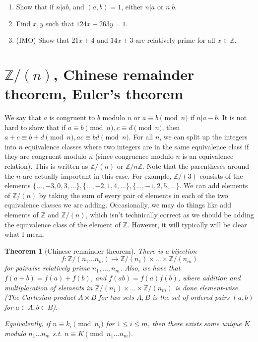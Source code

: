 \documentclass{article}
\theoremstyle{plain}
\newtheorem{theorem}{Theorem}
\numberwithin{equation}{section}
\begin{document}
\begin{enumerate}
\item Show that if $n|ab$, and $(a, b) = 1$, either $n|a$ or $n|b$.
\item Find $x, y$ such that $124x + 263y = 1$.
\item (IMO) Show that $21x + 4$ and $14x + 3$ are relatively prime for all $x\in\mathbb{Z}.$
\end{enumerate}

\section*{$\mathbb{Z}/(n)$, Chinese remainder theorem, Euler's theorem}

We say that $a$ is congruent to $b$ modulo $n$ or $a\equiv b\pmod{n}$ if $n|a - b$. It is not hard to show that if 
$a\equiv b\pmod{n}, c\equiv d\pmod{n}$, then $a + c\equiv b + d\pmod{n}, ac\equiv bd\pmod{n}.$ For all $n$, we can split 
up the integers into $n$ equivalence classes where two integers are in the same equivalence class if they are congruent
modulo $n$ (since congruence modulo $n$ is an equivalence relation). This is written as $\mathbb{Z}/(n)$ or $\mathbb{Z}/n\mathbb{Z}$.
Note that the parentheses around the $n$ are actually important in this case. For example, $\mathbb{Z}/(3)$ consists of 
the elements $\{\dots, -3, 0, 3, \dots\}, \{\dots, -2, 1, 4, \dots\}, \{\dots, -1, 2, 5, \dots\}$. We can add elements of 
$\mathbb{Z}/(n)$ by taking the sum of every pair of elements in each of the two equivalence classes we are adding. Occasionally, we 
may do things like add elements of $\mathbb{Z}$ and $\mathbb{Z}/(n)$, which isn't technically correct as we should be adding the 
equivalence class of the element of $\mathbb{Z}$. However, it will typically will be clear what I mean.

\begin{theorem}[Chinese remainder theorem]
There is a bijection $$f:\mathbb{Z}/(n_1\dots n_m)\rightarrow \mathbb{Z}/(n_1)\times\dots\times\mathbb{Z}/(n_m)$$ for pairwise 
relatively prime $n_1, \dots, n_m$. Also, we have that $f(a + b) = f(a) + f(b)$, and $f(ab) = f(a)f(b)$, where addition and
multiplacation of elements in $\mathbb{Z}/(n_1)\times\dots\times\mathbb{Z}/(n_m)$ is done element-wise. 
(The Cartesian product $A\times B$ for two sets $A, B$ is the set of ordered pairs $(a, b)$ for $a\in A, b\in B$).

Equivalently, if $n\equiv k_i\pmod{n_i}$ for $1 \le i\le m$, then there exists some unique $K$ modulo $n_1\dots n_m$ s.t. 
$n\equiv K\pmod{n_1\dots n_m}$.
\end{theorem}
\end{document}
